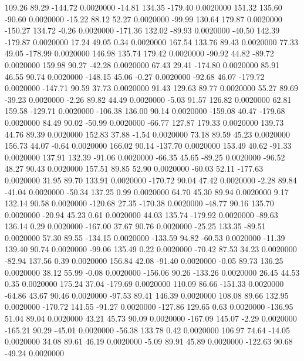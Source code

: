   109.26   89.29 -144.72   0.0020000
  -14.81  134.35 -179.40   0.0020000
  151.32  135.60  -90.60   0.0020000
  -15.22   88.12   52.27   0.0020000
  -99.99  130.64  179.87   0.0020000
 -150.27  134.72   -0.26   0.0020000
 -171.36  132.02  -89.93   0.0020000
  -40.50  142.39 -179.87   0.0020000
   17.24   49.05    0.34   0.0020000
  167.54  133.76   89.43   0.0020000
   77.33   49.05 -178.99   0.0020000
  146.98  135.74  179.42   0.0020000
  -90.92   44.82  -89.72   0.0020000
  159.98   90.27  -42.28   0.0020000
   67.43   29.41 -174.80   0.0020000
   85.91   46.55   90.74   0.0020000
 -148.15   45.06   -0.27   0.0020000
  -92.68   46.07 -179.72   0.0020000
 -147.71   90.59   37.73   0.0020000
   91.43  129.63   89.77   0.0020000
   55.27   89.69  -39.23   0.0020000
   -2.26   89.82   44.49   0.0020000
   -5.03   91.57  126.82   0.0020000
   62.81  159.58 -129.71   0.0020000
 -106.38  136.00   90.14   0.0020000
 -159.08   40.47 -179.68   0.0020000
   84.49   90.02  -50.99   0.0020000
  -66.77  127.87  179.33   0.0020000
  139.73   44.76   89.39   0.0020000
  152.83   37.88   -1.54   0.0020000
   73.18   89.59   45.23   0.0020000
  156.73   44.07   -0.64   0.0020000
  166.02   90.14 -137.70   0.0020000
  153.49   40.62  -91.33   0.0020000
  137.91  132.39  -91.06   0.0020000
  -66.35   45.65  -89.25   0.0020000
  -96.52   48.27   90.43   0.0020000
  157.51   89.85   52.90   0.0020000
  -60.03   52.11 -177.63   0.0020000
   31.95   89.70  133.91   0.0020000
 -170.72   90.04   47.42   0.0020000
   -2.28   89.84  -41.04   0.0020000
  -50.34  137.25    0.99   0.0020000
   64.70   45.30   89.94   0.0020000
    9.17  132.14   90.58   0.0020000
 -120.68   27.35 -170.38   0.0020000
  -48.77   90.16  135.70   0.0020000
  -20.94   45.23    0.61   0.0020000
   44.03  135.74 -179.92   0.0020000
  -89.63  136.14    0.29   0.0020000
 -167.00   37.67   90.76   0.0020000
  -25.25  133.35  -89.51   0.0020000
   57.30   89.55 -134.15   0.0020000
 -133.59   94.82  -60.53   0.0020000
  -11.39  139.40   90.74   0.0020000
  -99.06  135.49    0.22   0.0020000
  -70.42   87.53   34.23   0.0020000
  -82.94  137.56    0.39   0.0020000
  156.84   42.08  -91.40   0.0020000
   -0.05   89.73  136.25   0.0020000
   38.12   55.99   -0.08   0.0020000
 -156.06   90.26 -133.26   0.0020000
   26.45   44.53    0.35   0.0020000
  175.24   37.04 -179.69   0.0020000
  110.09   86.66 -151.33   0.0020000
  -64.86   43.67   90.46   0.0020000
  -97.53   89.41  146.39   0.0020000
  108.08   89.66  132.95   0.0020000
 -170.72  141.55  -91.27   0.0020000
 -127.86  129.65    0.63   0.0020000
 -136.95   51.04   89.04   0.0020000
   43.21   45.73   90.09   0.0020000
 -167.09  145.07   -2.29   0.0020000
 -165.21   90.29  -45.01   0.0020000
  -56.38  133.78    0.42   0.0020000
  106.97   74.64  -14.05   0.0020000
   34.08   89.61   46.19   0.0020000
   -5.09   89.91   45.89   0.0020000
 -122.63   90.68  -49.24   0.0020000